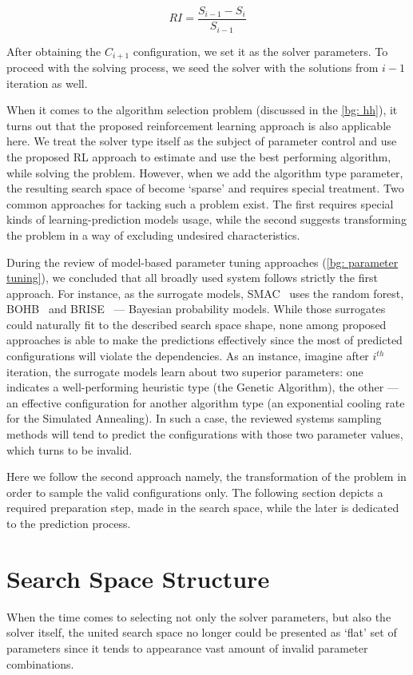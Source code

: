 \begin{equation}
RI = \frac{S_{i-1} - S_{i}}{S_{i-1}}
\label{concept: RI formula}
\end{equation}

After obtaining the $C_{i+1}$ configuration, we set it as the solver parameters. To proceed with the solving process, we seed the solver with the solutions from $i-1$ iteration as well.

When it comes to the algorithm selection problem (discussed in the \cref{bg: hh}), it turns out that the proposed reinforcement learning approach is also applicable here. We treat the solver type itself as the subject of parameter control and use the proposed RL approach to estimate and use the best performing algorithm, while solving the problem. However, when we add the algorithm type parameter, the resulting search space of become `sparse' and requires special treatment. Two common approaches for tacking such a problem exist. The first requires special kinds of learning-prediction models usage, while the second suggests transforming the problem in a way of excluding undesired characteristics.

During the review of model-based parameter tuning approaches (\cref{bg: parameter tuning}), we concluded that all broadly used system follows strictly the first approach. For instance, as the surrogate models, SMAC~\cite{hutter2011sequential} uses the random forest, BOHB~\cite{falkner2018bohb} and BRISE~\cite{brise2spl} — Bayesian probability models. While those surrogates could naturally fit to the described search space shape, none among proposed approaches is able to make the predictions effectively since the most of predicted configurations will violate the dependencies. As an instance, imagine after $i^{th}$ iteration, the surrogate models learn about two superior parameters: one indicates a well-performing heuristic type (the Genetic Algorithm), the other — an effective configuration for another algorithm type (an exponential cooling rate for the Simulated Annealing). In such a case, the reviewed systems sampling methods will tend to predict the configurations with those two parameter values, which turns to be invalid.

Here we follow the second approach namely, the transformation of the problem in order to sample the valid configurations only. The following section depicts a required preparation step, made in the search space, while the later is dedicated to the prediction process.


\section{Search Space Structure}\label{concept:search space}
When the time comes to selecting not only the solver parameters, but also the solver itself, the united search space no longer could be presented as `flat' set of parameters since it tends to appearance vast amount of invalid parameter combinations.

